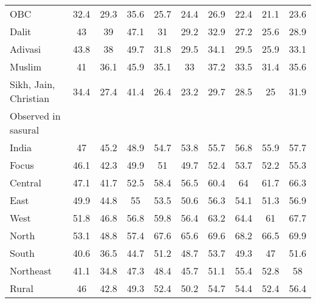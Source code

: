 \begin{tabular}{l*{9}{c}}
OBC                 &        32.4&        29.3&        35.6&        25.7&        24.4&        26.9&        22.4&        21.1&        23.6\\
Dalit               &          43&          39&        47.1&          31&        29.2&        32.9&        27.2&        25.6&        28.9\\
Adivasi             &        43.8&          38&        49.7&        31.8&        29.5&        34.1&        29.5&        25.9&        33.1\\
Muslim              &          41&        36.1&        45.9&        35.1&          33&        37.2&        33.5&        31.4&        35.6\\
Sikh, Jain, Christian&        34.4&        27.4&        41.4&        26.4&        23.2&        29.7&        28.5&          25&        31.9\\
\midrule
Observed in sasural &            &            &            &            &            &            &            &            &            \\
India               &          47&        45.2&        48.9&        54.7&        53.8&        55.7&        56.8&        55.9&        57.7\\
Focus               &        46.1&        42.3&        49.9&          51&        49.7&        52.4&        53.7&        52.2&        55.3\\
Central             &        47.1&        41.7&        52.5&        58.4&        56.5&        60.4&          64&        61.7&        66.3\\
East                &        49.9&        44.8&          55&        53.5&        50.6&        56.3&        54.1&        51.3&        56.9\\
West                &        51.8&        46.8&        56.8&        59.8&        56.4&        63.2&        64.4&          61&        67.7\\
North               &        53.1&        48.8&        57.4&        67.6&        65.6&        69.6&        68.2&        66.5&        69.9\\
South               &        40.6&        36.5&        44.7&        51.2&        48.7&        53.7&        49.3&          47&        51.6\\
Northeast           &        41.1&        34.8&        47.3&        48.4&        45.7&        51.1&        55.4&        52.8&          58\\
Rural               &          46&        42.8&        49.3&        52.4&        50.2&        54.7&        54.4&        52.4&        56.4\\

\end{tabular}
